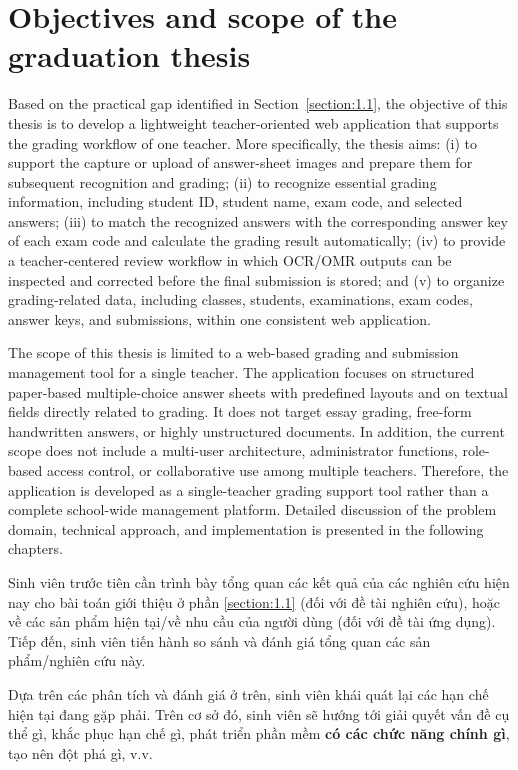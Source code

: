 \documentclass[../Main.tex]{subfiles}
\begin{document}
\fi
\section{Objectives and scope of the graduation thesis}
\label{section:1.2}
Based on the practical gap identified in Section~\ref{section:1.1}, the
objective of this thesis is to develop a lightweight teacher-oriented web
application that supports the grading workflow of one teacher. More
specifically, the thesis aims: (i) to support the capture or upload of
answer-sheet images and prepare them for subsequent recognition and grading;
(ii) to recognize essential grading information, including student ID, student
name, exam code, and selected answers; (iii) to match the recognized answers
with the corresponding answer key of each exam code and calculate the grading
result automatically; (iv) to provide a teacher-centered review workflow in
which OCR/OMR outputs can be inspected and corrected before the final
submission is stored; and (v) to organize grading-related data, including
classes, students, examinations, exam codes, answer keys, and submissions,
within one consistent web application.

The scope of this thesis is limited to a web-based grading and submission
management tool for a single teacher. The application focuses on structured
paper-based multiple-choice answer sheets with predefined layouts and on textual
fields directly related to grading. It does not target essay grading, free-form
handwritten answers, or highly unstructured documents. In addition, the current
scope does not include a multi-user architecture, administrator functions,
role-based access control, or collaborative use among multiple teachers.
Therefore, the application is developed as a single-teacher grading support tool
rather than a complete school-wide management platform. Detailed discussion of
the problem domain, technical approach, and implementation is presented in the
following chapters.

\iffalse
Sinh viên trước tiên cần trình bày tổng quan các kết quả của các nghiên cứu hiện nay cho bài toán giới thiệu ở phần \ref{section:1.1} (đối với đề tài nghiên cứu), hoặc về các sản phẩm hiện tại/về nhu cầu của người dùng (đối với đề tài ứng dụng). Tiếp đến, sinh viên tiến hành so sánh và đánh giá tổng quan các sản phẩm/nghiên cứu này.

Dựa trên các phân tích và đánh giá ở trên, sinh viên khái quát lại các hạn chế hiện tại đang gặp phải. Trên cơ sở đó, sinh viên sẽ hướng tới giải quyết vấn đề cụ thể gì, khắc phục hạn chế gì, phát triển phần mềm \textbf{có các chức năng chính gì}, tạo nên đột phá gì, v.v.
\end{document}
